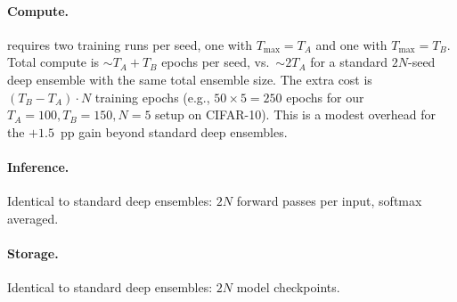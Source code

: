\paragraph{Compute.} \ours{} requires two training runs per seed, one with
$T_\mathrm{max}=T_A$ and one with $T_\mathrm{max}=T_B$. Total compute is
$\sim\!T_A + T_B$ epochs per seed, vs.\ $\sim\!2T_A$ for a standard $2N$-seed
deep ensemble with the same total ensemble size. The extra cost is
$(T_B - T_A) \cdot N$ training epochs (e.g., $50 \times 5 = 250$ epochs
for our $T_A=100, T_B=150, N=5$ setup on CIFAR-10). This is a modest
overhead for the $+1.5$~pp gain beyond standard deep ensembles.

\paragraph{Inference.} Identical to standard deep ensembles: $2N$ forward
passes per input, softmax averaged.

\paragraph{Storage.} Identical to standard deep ensembles: $2N$ model
checkpoints.
